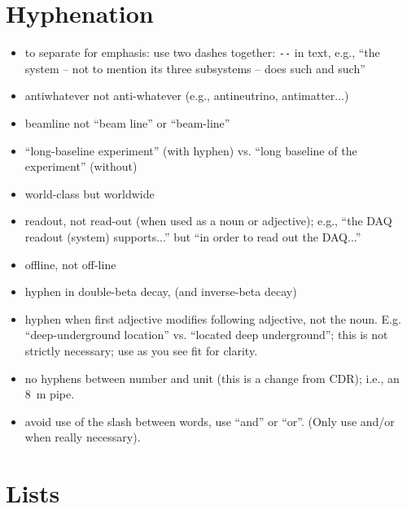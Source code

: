 \section{Hyphenation}
\label{sec:english-hyphen}

\begin{itemize}
\item to separate for emphasis: use two dashes together: \verb|--| in text, e.g.,  ``the system -- not to mention its three subsystems -- does such and such'' 
\item antiwhatever not anti-whatever (e.g., antineutrino, antimatter...)
\item beamline not ``beam line'' or ``beam-line'' 
\item ``long-baseline experiment''  (with hyphen) vs. ``long baseline of the experiment'' (without)
\item world-class but worldwide   
\item readout, not read-out (when used as a noun or adjective); e.g., ``the DAQ readout (system) supports...'' but ``in order to read out the DAQ...''
\item offline, not off-line
\item hyphen in double-beta decay, (and inverse-beta decay)
\item hyphen when first adjective modifies following adjective, not the noun. E.g. ``deep-underground location'' vs. ``located deep underground'';  this is not strictly necessary; use as you see fit for clarity.
\item no hyphens between number and unit (this is a change from CDR); i.e., an \SI{8}{\meter} pipe.
\item avoid use of the slash between words, use ``and'' or ``or''. (Only use and/or when really necessary).
\end{itemize}

\section{Lists}
\label{sec:english-lists}

